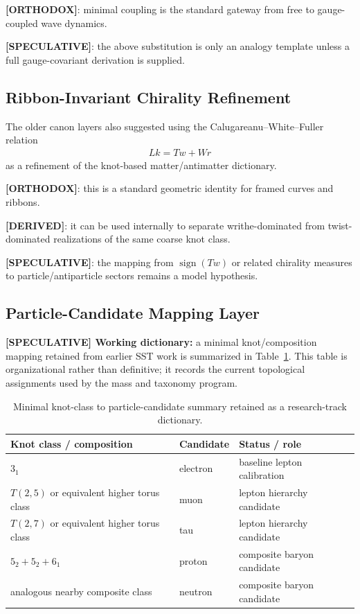 \documentclass[11pt]{article}
\begin{document}
\textbf{[ORTHODOX]}: minimal coupling is the standard gateway from free to gauge-coupled wave dynamics.

\textbf{[SPECULATIVE]}: the above substitution is only an analogy template unless a full gauge-covariant derivation is supplied.

\subsection{Ribbon-Invariant Chirality Refinement}
The older canon layers also suggested using the Calugareanu--White--Fuller relation
\begin{align}
    Lk = Tw + Wr
\end{align}
as a refinement of the knot-based matter/antimatter dictionary.

\textbf{[ORTHODOX]}: this is a standard geometric identity for framed curves and ribbons.

\textbf{[DERIVED]}: it can be used internally to separate writhe-dominated from twist-dominated realizations of the same coarse knot class.

\textbf{[SPECULATIVE]}: the mapping from $\operatorname{sign}(Tw)$ or related chirality measures to particle/antiparticle sectors remains a model hypothesis.

\subsection{Particle-Candidate Mapping Layer}
\textbf{[SPECULATIVE] Working dictionary:} a minimal knot/composition mapping retained from earlier SST work is summarized in Table~\ref{tab:particle-candidates}. This table is organizational rather than definitive; it records the current topological assignments used by the mass and taxonomy program.

\begin{table}[h]
\centering
\begin{tabular}{lll}
\hline
Knot class / composition & Candidate & Status / role \\
\hline
$3_1$ & electron & baseline lepton calibration \\
$T(2,5)$ or equivalent higher torus class & muon & lepton hierarchy candidate \\
$T(2,7)$ or equivalent higher torus class & tau & lepton hierarchy candidate \\
$5_2 + 5_2 + 6_1$ & proton & composite baryon candidate \\
analogous nearby composite class & neutron & composite baryon candidate \\
\hline
\end{tabular}
\caption{Minimal knot-class to particle-candidate summary retained as a research-track dictionary.}
\label{tab:particle-candidates}
\end{table}
\end{document}
